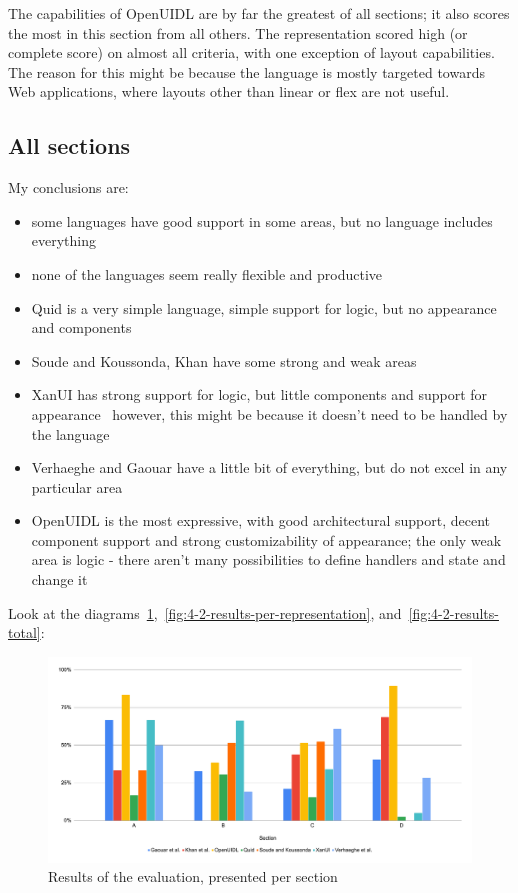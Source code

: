 The capabilities of OpenUIDL are by far the greatest of all sections; it also scores the most in this section from all others.
The representation scored high (or complete score) on almost all criteria, with one exception of layout capabilities.
The reason for this might be because the language is mostly targeted towards Web applications, where layouts other than linear or flex are not useful.

\subsection{All sections}
My conclusions are:
\begin{itemize}
    \item some languages have good support in some areas, but no language includes everything
    \item none of the languages seem really flexible and productive
    \item Quid is a very simple language, simple support for logic, but no appearance and components
    \item Soude and Koussonda, Khan have some strong and weak areas
    \item XanUI has strong support for logic, but little components and support for appearance \textendash\ however, this might be because it doesn't need to be handled by the language
    \item Verhaeghe and Gaouar have a little bit of everything, but do not excel in any particular area
    \item OpenUIDL is the most expressive, with good architectural support, decent component support and strong customizability of appearance; the only weak area is logic - there aren't many possibilities to define handlers and state and change it
\end{itemize}

Look at the diagrams~\ref{fig:4-2-results-per-section},~\ref{fig:4-2-results-per-representation}, and~\ref{fig:4-2-results-total}:
\begin{figure}
    \centering
    \includegraphics[width=\textwidth]{4-results-and-discussion/results-per-section}
    \caption{Results of the evaluation, presented per section}
    \label{fig:4-2-results-per-section}
\end{figure}

